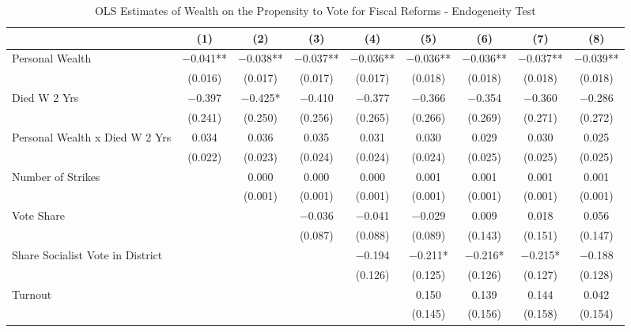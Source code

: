 \begin{table}

\caption{\label{tab:harnas}OLS Estimates of Wealth on the Propensity to Vote for Fiscal Reforms - Endogeneity Test}
\centering
\begin{tabular}[t]{lcccccccc}
\toprule
  & (1) & (2) & (3) & (4) & (5) & (6) & (7) & (8)\\
\midrule
Personal Wealth & \num{-0.041}** & \num{-0.038}** & \num{-0.037}** & \num{-0.036}** & \num{-0.036}** & \num{-0.036}** & \num{-0.037}** & \num{-0.039}**\\
 & (\num{0.016}) & (\num{0.017}) & (\num{0.017}) & (\num{0.017}) & (\num{0.018}) & (\num{0.018}) & (\num{0.018}) & (\num{0.018})\\
Died W 2 Yrs & \num{-0.397} & \num{-0.425}* & \num{-0.410} & \num{-0.377} & \num{-0.366} & \num{-0.354} & \num{-0.360} & \num{-0.286}\\
 & (\num{0.241}) & (\num{0.250}) & (\num{0.256}) & (\num{0.265}) & (\num{0.266}) & (\num{0.269}) & (\num{0.271}) & (\num{0.272})\\
Personal Wealth x Died W 2 Yrs & \num{0.034} & \num{0.036} & \num{0.035} & \num{0.031} & \num{0.030} & \num{0.029} & \num{0.030} & \num{0.025}\\
 & (\num{0.022}) & (\num{0.023}) & (\num{0.024}) & (\num{0.024}) & (\num{0.024}) & (\num{0.025}) & (\num{0.025}) & (\num{0.025})\\
Number of Strikes &  & \num{0.000} & \num{0.000} & \num{0.000} & \num{0.001} & \num{0.001} & \num{0.001} & \num{0.001}\\
 &  & (\num{0.001}) & (\num{0.001}) & (\num{0.001}) & (\num{0.001}) & (\num{0.001}) & (\num{0.001}) & (\num{0.001})\\
Vote Share &  &  & \num{-0.036} & \num{-0.041} & \num{-0.029} & \num{0.009} & \num{0.018} & \num{0.056}\\
 &  &  & (\num{0.087}) & (\num{0.088}) & (\num{0.089}) & (\num{0.143}) & (\num{0.151}) & (\num{0.147})\\
Share Socialist Vote in District &  &  &  & \num{-0.194} & \num{-0.211}* & \num{-0.216}* & \num{-0.215}* & \num{-0.188}\\
 &  &  &  & (\num{0.126}) & (\num{0.125}) & (\num{0.126}) & (\num{0.127}) & (\num{0.128})\\
Turnout &  &  &  &  & \num{0.150} & \num{0.139} & \num{0.144} & \num{0.042}\\
 &  &  &  &  & (\num{0.145}) & (\num{0.156}) & (\num{0.158}) & (\num{0.154})\\

\end{tabular}
\end{table}

